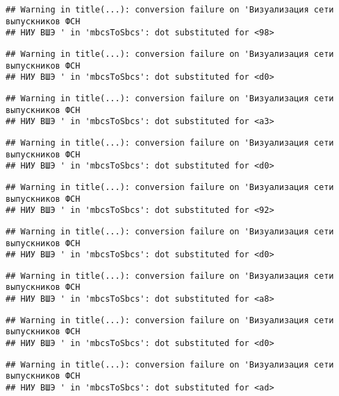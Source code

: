 \documentclass[
]{article}
\begin{document}
\begin{verbatim}
## Warning in title(...): conversion failure on 'Визуализация сети выпускников ФСН
## НИУ ВШЭ ' in 'mbcsToSbcs': dot substituted for <98>
\end{verbatim}

\begin{verbatim}
## Warning in title(...): conversion failure on 'Визуализация сети выпускников ФСН
## НИУ ВШЭ ' in 'mbcsToSbcs': dot substituted for <d0>
\end{verbatim}

\begin{verbatim}
## Warning in title(...): conversion failure on 'Визуализация сети выпускников ФСН
## НИУ ВШЭ ' in 'mbcsToSbcs': dot substituted for <a3>
\end{verbatim}

\begin{verbatim}
## Warning in title(...): conversion failure on 'Визуализация сети выпускников ФСН
## НИУ ВШЭ ' in 'mbcsToSbcs': dot substituted for <d0>
\end{verbatim}

\begin{verbatim}
## Warning in title(...): conversion failure on 'Визуализация сети выпускников ФСН
## НИУ ВШЭ ' in 'mbcsToSbcs': dot substituted for <92>
\end{verbatim}

\begin{verbatim}
## Warning in title(...): conversion failure on 'Визуализация сети выпускников ФСН
## НИУ ВШЭ ' in 'mbcsToSbcs': dot substituted for <d0>
\end{verbatim}

\begin{verbatim}
## Warning in title(...): conversion failure on 'Визуализация сети выпускников ФСН
## НИУ ВШЭ ' in 'mbcsToSbcs': dot substituted for <a8>
\end{verbatim}

\begin{verbatim}
## Warning in title(...): conversion failure on 'Визуализация сети выпускников ФСН
## НИУ ВШЭ ' in 'mbcsToSbcs': dot substituted for <d0>
\end{verbatim}

\begin{verbatim}
## Warning in title(...): conversion failure on 'Визуализация сети выпускников ФСН
## НИУ ВШЭ ' in 'mbcsToSbcs': dot substituted for <ad>
\end{verbatim}
\end{document}

